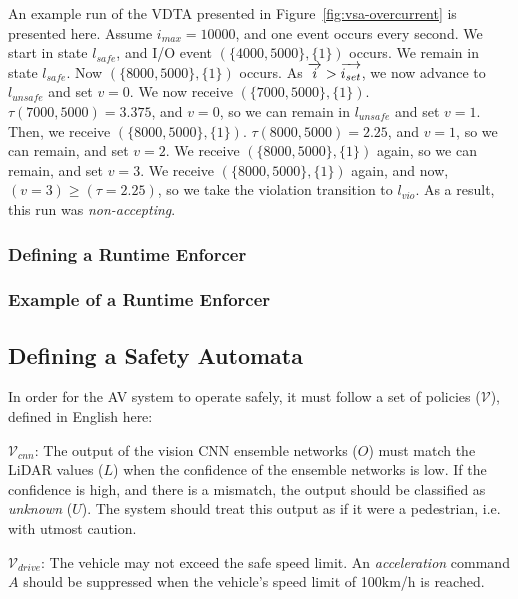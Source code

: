 \begin{example}
	An example run of the VDTA presented in Figure~\ref{fig:vsa-overcurrent} is presented here.
	Assume $i_{max} = 10000$, and one event occurs every second.
	We start in state $l_{safe}$, and I/O event $(\{4000, 5000\},\{1\})$ occurs.
	We remain in state $l_{safe}$.
	Now $(\{8000, 5000\},\{1\})$ occurs.
	As $\overrightarrow{i} > \overrightarrow{i_{set}}$, we now advance to $l_{unsafe}$ and set $v = 0$.
	We now receive $(\{7000, 5000\},\{1\})$.
	$\tau(7000, 5000) = 3.375$, and $v = 0$, so we can remain in $l_{unsafe}$ and set $v = 1$.
	Then, we receive $(\{8000, 5000\},\{1\})$.
	$\tau(8000, 5000) = 2.25$, and $v = 1$, so we can remain, and set $v = 2$.
	We receive $(\{8000, 5000\},\{1\})$ again, so we can remain, and set $v = 3$.
	We receive $(\{8000, 5000\},\{1\})$ again, and now, $(v = 3) \geq (\tau = 2.25)$, so we take the violation transition to $l_{vio}$.
	As a result, this run was \textit{non-accepting}.
	
	
\end{example}


\subsubsection{Defining a Runtime Enforcer}

\subsubsection{Example of a Runtime Enforcer}









\subsection{Defining a Safety Automata}

In order for the \ac{AV} system to operate safely, it must follow a set of policies ($\mathcal{V}$), defined in English here:

$\mathcal{V}_{cnn}$: The output of the vision \ac{CNN} ensemble networks ($O$) must match the \ac{LiDAR} values ($L$) when the confidence of the ensemble networks is low. 
If the confidence is high, and there is a mismatch, the output should be classified as \textit{unknown} ($U$).
The system should treat this output as if it were a pedestrian, i.e. with utmost caution.

$\mathcal{V}_{drive}$: The vehicle may not exceed the safe speed limit. 
An \textit{acceleration} command $A$ should be suppressed when the vehicle's speed limit of 100km/h is reached.


